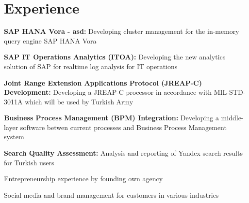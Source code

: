 \section{Experience}
\sectionspacehalf
\vspace{\topsep} %
\begin{tightitemize}
  \item \textbf{SAP HANA Vora - asd:} Developing cluster management for the in-memory query engine SAP HANA Vora
  \item \textbf{SAP IT Operations Analytics (ITOA):} Developing the new analytics solution of SAP for realtime log analysis for IT operations
\end{tightitemize}
\sectionspacehalf
\begin{tightitemize}
\item \textbf{Joint Range Extension Applications Protocol (JREAP-C) Development:} Developing a JREAP-C processor in accordance with MIL-STD-3011A which will be used by Turkish Army
\item \textbf{Business Process Management (BPM) Integration:} Developing a middle-layer software betwen current processes and
Business Process Management system
\end{tightitemize}
\sectionspacehalf
\begin{tightitemize}
\item \textbf{Search Quality Assessment:} Analysis and reporting of Yandex search results for Turkish users
\end{tightitemize}
\sectionspacehalf
\begin{tightitemize}
\item Entrepreneurship experience by founding own agency
\item Social media and brand management for customers in various industries
\end{tightitemize}
\sectionspacehalf

